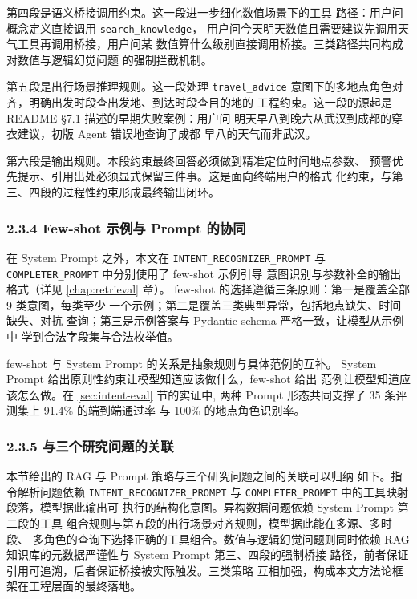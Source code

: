 第四段是语义桥接调用约束。这一段进一步细化数值场景下的工具
路径：用户问概念定义直接调用 \texttt{search\_\bk{}knowledge}，
用户问今天明天数值且需要建议先调用天气工具再调用桥接，用户问某
数值算什么级别直接调用桥接。三类路径共同构成对数值与逻辑幻觉问题
的强制拦截机制。

第五段是出行场景推理规则。这一段处理 \texttt{travel\_\bk{}advice}
意图下的多地点角色对齐，明确出发时段查出发地、到达时段查目的地的
工程约束。这一段的源起是 README §7.1 描述的早期失败案例：用户问
明天早八到晚六从武汉到成都的穿衣建议，初版 Agent 错误地查询了成都
早八的天气而非武汉。

第六段是输出规则。本段约束最终回答必须做到精准定位时间地点参数、
预警优先提示、引用出处必须显式保留三件事。这是面向终端用户的格式
化约束，与第三、四段的过程性约束形成最终输出闭环。

\subsubsection*{2.3.4 \quad Few-shot 示例与 Prompt 的协同}

在 System Prompt 之外，本文在 \texttt{INTENT\_\bk{}RECOGNIZER\_\bk{}PROMPT}
与 \texttt{COMPLETER\_\bk{}PROMPT} 中分别使用了 few-shot 示例引导
意图识别与参数补全的输出格式（详见 \ref{chap:retrieval} 章）。
few-shot 的选择遵循三条原则：第一是覆盖全部 9 类意图，每类至少
一个示例；第二是覆盖三类典型异常，包括地点缺失、时间缺失、对抗
查询；第三是示例答案与 Pydantic schema 严格一致，让模型从示例中
学到合法字段集与合法枚举值。

few-shot 与 System Prompt 的关系是抽象规则与具体范例的互补。
System Prompt 给出原则性约束让模型知道应该做什么，few-shot 给出
范例让模型知道应该怎么做。在 \ref{sec:intent-eval} 节的实证中,
两种 Prompt 形态共同支撑了 35 条评测集上 91.4\% 的端到端通过率
与 100\% 的地点角色识别率。

\subsubsection*{2.3.5 \quad 与三个研究问题的关联}

本节给出的 RAG 与 Prompt 策略与三个研究问题之间的关联可以归纳
如下。指令解析问题依赖 \texttt{INTENT\_\bk{}RECOGNIZER\_\bk{}PROMPT} 与
\texttt{COMPLETER\_\bk{}PROMPT} 中的工具映射段落，模型据此输出可
执行的结构化意图。异构数据问题依赖 System Prompt 第二段的工具
组合规则与第五段的出行场景对齐规则，模型据此能在多源、多时段、
多角色的查询下选择正确的工具组合。数值与逻辑幻觉问题则同时依赖
RAG 知识库的元数据严谨性与 System Prompt 第三、四段的强制桥接
路径，前者保证引用可追溯，后者保证桥接被实际触发。三类策略
互相加强，构成本文方法论框架在工程层面的最终落地。

